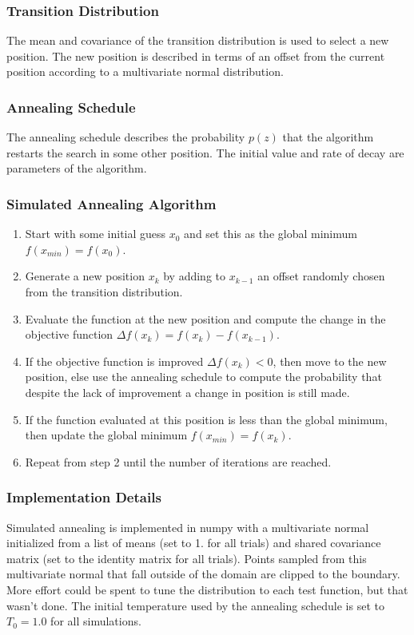\documentclass{vgtc}                          %
\begin{document}
\subsubsection{Transition Distribution}
The mean and covariance of the transition distribution is used to select a new position.  The new position is described in terms of an offset from the current position according to a multivariate normal distribution.

\subsubsection{Annealing Schedule}
The annealing schedule describes the probability $p(z)$ that the algorithm restarts the search in some other position.  The initial value and rate of decay are parameters of the algorithm.

\subsubsection{Simulated Annealing Algorithm}

\begin{enumerate}
\item Start with some initial guess $x_0$ and set this as the global minimum $f(x_{min}) = f(x_0)$.
\item Generate a new position $x_k$ by adding to $x_{k-1}$ an offset randomly chosen from the transition distribution.
\item Evaluate the function at the new position and compute the change in the objective function $\Delta f(x_k) = f(x_k) - f(x_{k-1})$.
\item If the objective function is improved $\Delta f(x_k) < 0$, then move to the new position, else use the annealing schedule to compute the probability that despite the lack of improvement a change in position is still made.
\item If the function evaluated at this position is less than the global minimum, then update the global minimum $f(x_{min}) = f(x_k)$.
\item Repeat from step 2 until the number of iterations are reached.
\end{enumerate}

\subsubsection{Implementation Details}

Simulated annealing is implemented in numpy with a multivariate normal initialized from a list of means (set to 1. for all trials) and shared covariance matrix (set to the identity matrix for all trials).  Points sampled from this multivariate normal that fall outside of the domain are clipped to the boundary.  More effort could be spent to tune the distribution to each test function, but that wasn't done.  The initial temperature used by the annealing schedule is set to $T_0=1.0$ for all simulations.
\end{document}
